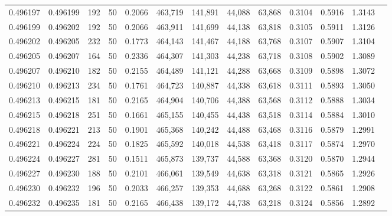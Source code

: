 \begin{tabular}{rrrrrrrrrrrrr}
0.496197 & 0.496199 &   192 &  50 &                                     0.2066 & 463,719 & 141,891 &  44,088 &  63,868 & 0.3104 & 0.5916 & 1.3143 \\
0.496199 & 0.496202 &   192 &  50 &                                     0.2066 & 463,911 & 141,699 &  44,138 &  63,818 & 0.3105 & 0.5911 & 1.3126 \\
0.496202 & 0.496205 &   232 &  50 &                                     0.1773 & 464,143 & 141,467 &  44,188 &  63,768 & 0.3107 & 0.5907 & 1.3104 \\
0.496205 & 0.496207 &   164 &  50 &                                     0.2336 & 464,307 & 141,303 &  44,238 &  63,718 & 0.3108 & 0.5902 & 1.3089 \\
0.496207 & 0.496210 &   182 &  50 &                                     0.2155 & 464,489 & 141,121 &  44,288 &  63,668 & 0.3109 & 0.5898 & 1.3072 \\
0.496210 & 0.496213 &   234 &  50 &                                     0.1761 & 464,723 & 140,887 &  44,338 &  63,618 & 0.3111 & 0.5893 & 1.3050 \\
0.496213 & 0.496215 &   181 &  50 &                                     0.2165 & 464,904 & 140,706 &  44,388 &  63,568 & 0.3112 & 0.5888 & 1.3034 \\
0.496215 & 0.496218 &   251 &  50 &                                     0.1661 & 465,155 & 140,455 &  44,438 &  63,518 & 0.3114 & 0.5884 & 1.3010 \\
0.496218 & 0.496221 &   213 &  50 &                                     0.1901 & 465,368 & 140,242 &  44,488 &  63,468 & 0.3116 & 0.5879 & 1.2991 \\
0.496221 & 0.496224 &   224 &  50 &                                     0.1825 & 465,592 & 140,018 &  44,538 &  63,418 & 0.3117 & 0.5874 & 1.2970 \\
0.496224 & 0.496227 &   281 &  50 &                                     0.1511 & 465,873 & 139,737 &  44,588 &  63,368 & 0.3120 & 0.5870 & 1.2944 \\
0.496227 & 0.496230 &   188 &  50 &                                     0.2101 & 466,061 & 139,549 &  44,638 &  63,318 & 0.3121 & 0.5865 & 1.2926 \\
0.496230 & 0.496232 &   196 &  50 &                                     0.2033 & 466,257 & 139,353 &  44,688 &  63,268 & 0.3122 & 0.5861 & 1.2908 \\
0.496232 & 0.496235 &   181 &  50 &                                     0.2165 & 466,438 & 139,172 &  44,738 &  63,218 & 0.3124 & 0.5856 & 1.2892 \\

\end{tabular}
